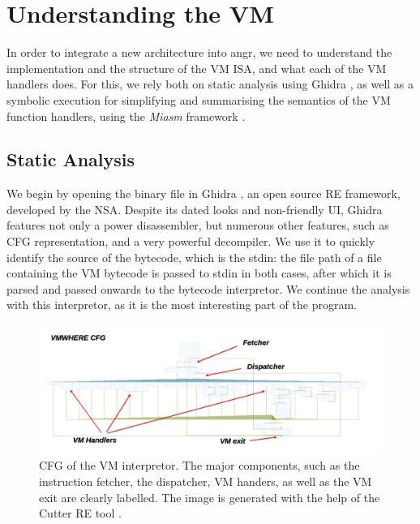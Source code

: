 \section{Understanding the VM}

In order to integrate a new architecture into angr, we need to understand the implementation and the structure of the \gls{VM} \gls{ISA}, and what each of the \gls{VM} handlers does. For this, we rely both on static analysis using Ghidra \cite{ghidra}, as well as a symbolic execution for simplifying and summarising the semantics of the \gls{VM} function handlers, using the \emph{Miasm} framework \cite{miasm}.

\subsection{Static Analysis}
\label{static_ghidra}

We begin by opening the binary file in Ghidra \cite{ghidra}, an open source \gls{RE} framework, developed by the \gls{NSA}. Despite its dated looks and non-friendly \gls{UI}, Ghidra features not only a power disassembler, but numerous other features, such as \gls{CFG} representation, and a very powerful decompiler. We use it to quickly identify the source of the bytecode, which is the \gls{stdin}: the file path of a file containing the \gls{VM} bytecode is passed to \gls{stdin} in both cases, after which it is parsed and passed onwards to the bytecode interpretor. We continue the analysis with this interpretor, as it is the most interesting part of the program.

\begin{figure}[ht]
    \centering
    \includegraphics[width=\textwidth]{./images/cfg_vmwhere}
    \caption{\gls{CFG} of the  \gls{VM} interpretor. The major components, such as the instruction fetcher, the dispatcher, \gls{VM} handers, as well as the \gls{VM} exit are clearly labelled. The image is generated with the help of the Cutter \gls{RE} tool \cite{cutter}.}
    \label{fig:cfg_vmwhere}
\end{figure}


